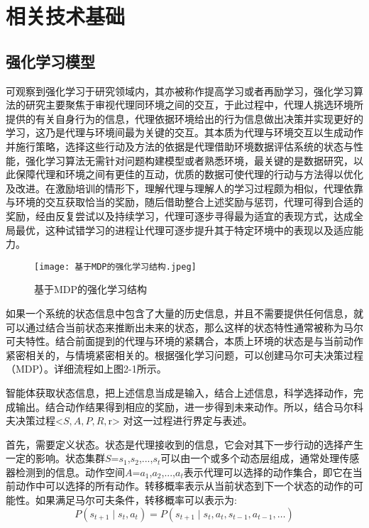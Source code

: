 \chapter{相关技术基础}

\section{强化学习模型}

可观察到强化学习于研究领域内，其亦被称作提高学习或者再励学习，强化学习算法的研究主要聚焦于审视代理同环境之间的交互，于此过程中，代理人挑选环境所提供的有关自身行为的信息，代理依据环境给出的行为信息做出决策并实现更好的学习，这乃是代理与环境间最为关键的交互。其本质为代理与环境交互以生成动作并施行策略，选择这些行动及方法的依据是代理借助环境数据评估系统的状态与性能，强化学习算法无需针对问题构建模型或者熟悉环境，最关键的是数据研究，以此保障代理和环境之间有更佳的互动，优质的数据可使代理的行动与方法得以优化及改进。在激励培训的情形下，理解代理与理解人的学习过程颇为相似，代理依靠与环境的交互获取恰当的奖励，随后借助整合上述奖励与惩罚，代理可得到合适的奖励，经由反复尝试以及持续学习，代理可逐步寻得最为适宜的表现方式，达成全局最优，这种试错学习的进程让代理可逐步提升其于特定环境中的表现以及适应能力。


\begin{figure}[hbt]
	\centering
	\texttt{[image: 基于MDP的强化学习结构.jpeg]}
	\caption{基于MDP的强化学习结构}
	\label{f.example}
\end{figure}

如果一个系统的状态信息中包含了大量的历史信息，并且不需要提供任何信息，就可以通过结合当前状态来推断出未来的状态，那么这样的状态特性通常被称为马尔可夫特性。结合前面提到的代理与环境的紧耦合，本质上环境的状态是与当前动作紧密相关的，与情境紧密相关的。根据强化学习问题，可以创建马尔可夫决策过程（MDP）\cite{garcia2013markov}。详细流程如上图2-1所示。

智能体获取状态信息，把上述信息当成是输入，结合上述信息，科学选择动作，完成输出。结合动作结果得到相应的奖励，进一步得到未来动作。所以，结合马尔科夫决策过程<$S,A,P,R,$r>
对这一过程进行界定与表述。

首先，需要定义状态。状态是代理接收到的信息，它会对其下一步行动的选择产生一定的影响。状态集群$S$={${s_{1}}$,${s_{2}}$,...,${s_{t}}$}可以由一个或多个动态层组成，通常处理传感器检测到的信息。动作空间$A$={${a_{1}}$,${a_{2}}$,...,${a_{t}}$}表示代理可以选择的动作集合，即它在当前动作中可以选择的所有动作。转移概率表示从当前状态到下一个状态的动作的可能性。如果满足马尔可夫条件，转移概率可以表示为:
\begin{equation}
P(s_{t+1} \mid s_t, a_t) = P(s_{t+1} \mid s_t, a_t, s_{t-1}, a_{t-1}, \ldots)
\end{equation}


